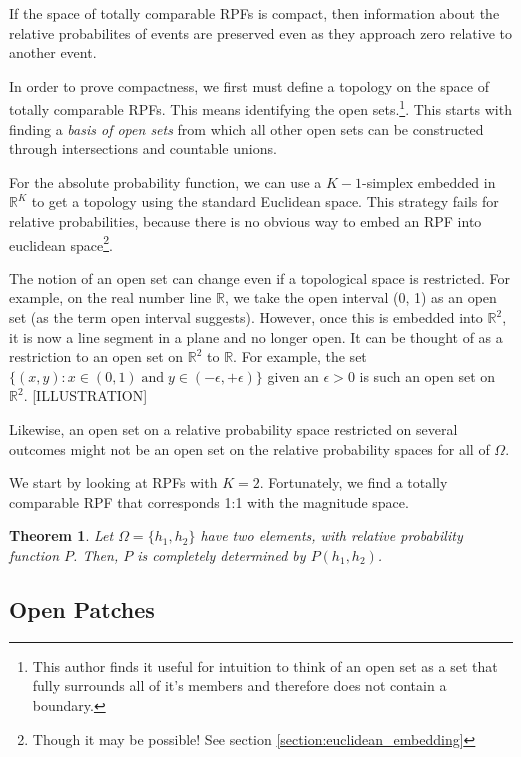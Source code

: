 \documentclass[twoside]{article}
\theoremstyle{plain}%
\newtheorem{theorem}{Theorem}[section]
\theoremstyle{definition}
\theoremstyle{remark}
\begin{document}
If the space of totally comparable RPFs is compact, then information about the relative probabilites of events are preserved even as they approach zero relative to another event.

In order to prove compactness, we first must define a topology on the space of totally comparable RPFs. This means identifying the open sets.\footnote{This author finds it useful for intuition to think of an open set as a set that fully surrounds all of it's members and therefore does not contain a boundary.}. This starts with finding a \textit{basis of open sets} from which all other open sets can be constructed through intersections and countable unions.

For the absolute probability function, we can use a \(K-1\)-simplex embedded in \(\mathbb{R}^K\) to get a topology using the standard Euclidean space. This strategy fails for relative probabilities, because there is no obvious way to embed an RPF into euclidean space\footnote{Though it may be possible! See section \ref{section:euclidean_embedding}}.

The notion of an open set can change even if a topological space is restricted. For example, on the real number line \(\mathbb{R}\), we take the open interval (0, 1) as an open set (as the term open interval suggests). However, once this is embedded into \(\mathbb{R}^2\), it is now a line segment in a plane and no longer open. It can be thought of as a restriction to an open set on \(\mathbb{R}^2\) to \(\mathbb{R}\). For example, the set \(\{(x, y): x \in (0, 1)\;  \text{and}\;  y \in (-\epsilon, +\epsilon)\}\) given an \(\epsilon > 0\) is such an open set on \(\mathbb{R}^2\). [ILLUSTRATION]

Likewise, an open set on a relative probability space restricted on several outcomes might not be an open set on the relative probability spaces for all of \(\Omega\).

We start by looking at RPFs with \(K = 2\). Fortunately, we find a totally comparable RPF that corresponds 1:1 with the magnitude space.

\begin{theorem}
Let \(\Omega = \{h_1, h_2\}\) have two elements, with relative probability function \(P\). Then, \(P\) is completely determined by \(P(h_1, h_2)\).
\end{theorem}

\subsection{Open Patches}
\end{document}
